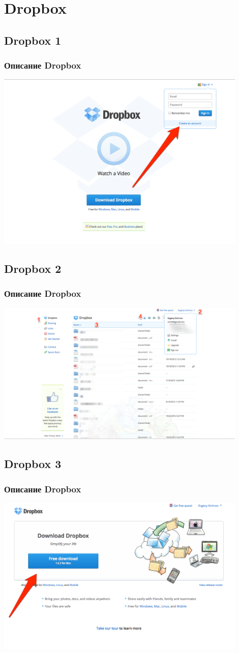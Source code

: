 \documentclass[compress,red]{beamer}
\begin{document}
\section{Dropbox}
\subsection{Dropbox 1}
\begin{frame}[fragile]
  \frametitle{Описание Dropbox}
  \centerline{\includegraphics[width=0.9\textwidth]{images/dropbox1.png}}
\end{frame}

\subsection{Dropbox 2}
\begin{frame}[fragile]
  \frametitle{Описание Dropbox}
  \centerline{\includegraphics[width=0.9\textwidth]{images/dropbox2.png}}
\end{frame}

\subsection{Dropbox 3}
\begin{frame}[fragile]
  \frametitle{Описание Dropbox}
  \centerline{\includegraphics[width=0.9\textwidth]{images/dropbox3.png}}
\end{frame}
\end{document}
